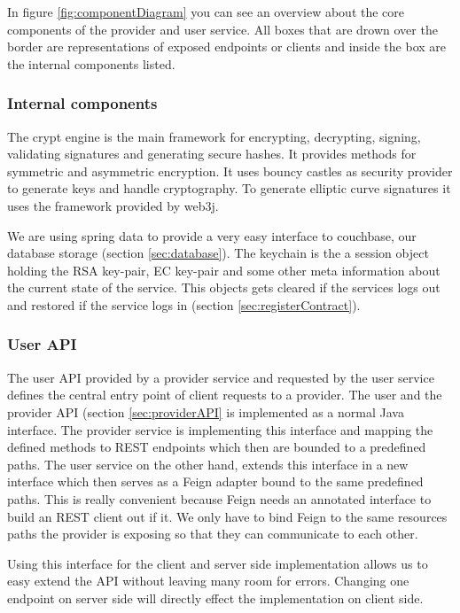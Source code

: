 In figure \ref{fig:componentDiagram} you can see an overview about the core components of the provider and user service. All boxes that are drown over the border are representations of exposed endpoints or clients and inside the box are the internal components listed.

\subsubsection{Internal components}
The crypt engine is the main framework for encrypting, decrypting, signing, validating signatures and generating secure hashes. It provides methods for symmetric and asymmetric encryption. It uses bouncy castles as security provider to generate keys and handle cryptography. To generate elliptic curve signatures it uses the framework provided by web3j. 

We are using spring data to provide a very easy interface to couchbase, our database storage (section \ref{sec:database}). The keychain is the a session object holding the RSA key-pair, EC key-pair and some other meta information about the current state of the service. This objects gets cleared if the services logs out and restored if the service logs in (section \ref{sec:registerContract}). 

\subsubsection{User API}
\label{sec:userAPI}
The user API provided by a provider service and requested by the user service defines the central entry point of client requests to a provider. The user and the provider API (section \ref{sec:providerAPI} is implemented as a normal Java interface. The provider service is implementing this interface and mapping the defined methods to REST endpoints which then are bounded to a predefined paths. The user service on the other hand, extends this interface in a new interface which then serves as a Feign adapter bound to the same predefined paths. This is really convenient because Feign needs an annotated interface to build an REST client out if it. We only have to bind Feign to the same resources paths the provider is exposing so that they can communicate to each other. 

Using this interface for the client and server side implementation allows us to easy extend the API without leaving many room for errors. Changing one endpoint on server side will directly effect the implementation on client side. 

